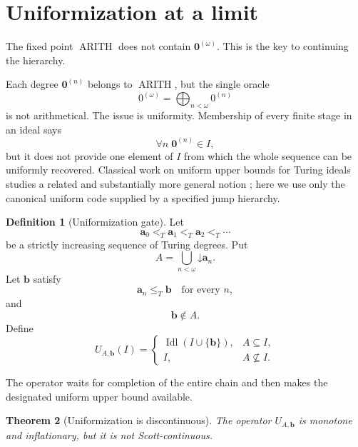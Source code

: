 \documentclass[11pt]{article}
\newtheorem{theorem}{Theorem}[section]
\theoremstyle{definition}
\newtheorem{definition}[theorem]{Definition}
\theoremstyle{remark}
\newcommand{\Arith}{\operatorname{ARITH}}
\newcommand{\down}{\mathord{\downarrow}}
\newcommand{\bigjoin}{\bigoplus}
\newcommand{\leT}{\leq_T}
\newcommand{\ltT}{<_T}
\begin{document}
\section{Uniformization at a limit}

The fixed point $\Arith$ does not contain $\mathbf0^{(\omega)}$. This is the key to continuing the hierarchy.

Each degree $\mathbf0^{(n)}$ belongs to $\Arith$, but the single oracle
\begin{equation}
0^{(\omega)}=\bigjoin_{n<\omega}0^{(n)}
\label{eq:omega-jump}
\end{equation}
is not arithmetical. The issue is uniformity. Membership of every finite stage in an ideal says
\[
\forall n\;\mathbf0^{(n)}\in I,
\]
but it does not provide one element of $I$ from which the whole sequence can be uniformly recovered. Classical work on uniform upper bounds for Turing ideals studies a related and substantially more general notion \cite{Hodes1982}; here we use only the canonical uniform code supplied by a specified jump hierarchy.

\begin{definition}[Uniformization gate]
\label{def:uniformization}
Let
\[
\mathbf a_0\ltT\mathbf a_1\ltT\mathbf a_2\ltT\cdots
\]
be a strictly increasing sequence of Turing degrees. Put
\begin{equation}
A=\bigcup_{n<\omega}\down\mathbf a_n.
\label{eq:A-chain}
\end{equation}
Let $\mathbf b$ satisfy
\begin{equation}
\mathbf a_n\leT\mathbf b\quad\text{for every }n,
\label{eq:b-upper}
\end{equation}
and
\begin{equation}
\mathbf b\notin A.
\label{eq:b-not-A}
\end{equation}
Define
\begin{equation}
U_{A,\mathbf b}(I)
=
\begin{cases}
\operatorname{Idl}(I\cup\{\mathbf b\}),&A\subseteq I,\\[3pt]
I,&A\nsubseteq I.
\end{cases}
\label{eq:uniformization}
\end{equation}
\end{definition}

The operator waits for completion of the entire chain and then makes the designated uniform upper bound available.

\begin{theorem}[Uniformization is discontinuous]
\label{thm:uniformization-discontinuous}
The operator $U_{A,\mathbf b}$ is monotone and inflationary, but it is not Scott-continuous.
\end{theorem}
\end{document}
